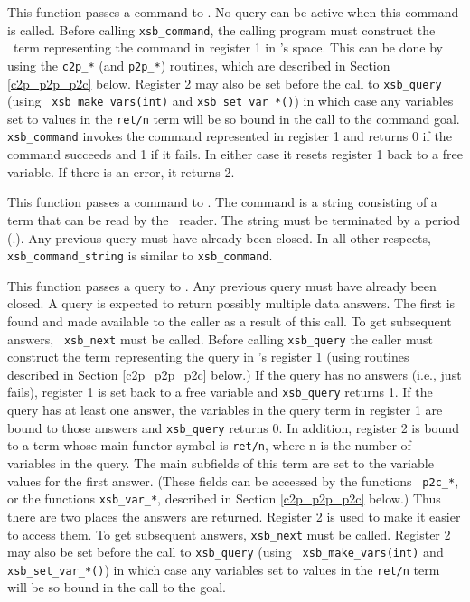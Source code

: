 \begin{description}
 
This function passes a command to \ourprolog .  No query can be active
when this command is called.  Before calling {\tt xsb\_command}, the
calling program must construct the \ourprolog\ term representing the
command in register 1 in \ourprolog 's space.  This can be done by
using the {\tt c2p\_*} (and {\tt p2p\_*}) routines, which are
described in Section \ref{c2p_p2p_p2c} below.  Register 2 may also be
set before the call to {\tt xsb\_query} (using {\tt
xsb\_make\_vars(int)} and {\tt xsb\_set\_var\_*()}) in which case any
variables set to values in the {\tt ret/n} term will be so bound in
the call to the command goal.  {\tt xsb\_command} invokes the command
represented in register 1 and returns 0 if the command succeeds and 1
if it fails. In either case it resets register 1 back to a free
variable. If there is an error, it returns 2.

 
This function passes a command to \ourprolog .  The command is a
string consisting of a term that can be read by the \ourprolog\
reader.  The string must be terminated by a period (.).  Any previous
query must have already been closed.  In all other respects, {\tt
xsb\_command\_string} is similar to {\tt xsb\_command}.

 
This function passes a query to \ourprolog .  Any previous query must
have already been closed.  A query is expected to return possibly
multiple data answers.  The first is found and made available to the
caller as a result of this call.  To get subsequent answers, {\tt
xsb\_next} must be called.  Before calling {\tt xsb\_query} the caller
must construct the term representing the query in \ourprolog 's
register 1 (using routines described in Section \ref{c2p_p2p_p2c}
below.)  If the query has no answers (i.e., just fails), register 1 is
set back to a free variable and {\tt xsb\_query} returns 1.  If the
query has at least one answer, the variables in the query term in
register 1 are bound to those answers and {\tt xsb\_query} returns 0.
In addition, register 2 is bound to a term whose main functor symbol
is {\tt ret/n}, where n is the number of variables in the query. The
main subfields of this term are set to the variable values for the
first answer. (These fields can be accessed by the functions {\tt
p2c\_*}, or the functions {\tt xsb\_var\_*}, described in Section
\ref{c2p_p2p_p2c} below.)  Thus there are two places the answers are
returned. Register 2 is used to make it easier to access them.  To get
subsequent answers, {\tt xsb\_next} must be called.  Register 2 may
also be set before the call to {\tt xsb\_query} (using {\tt
xsb\_make\_vars(int)} and {\tt xsb\_set\_var\_*()}) in which case any
variables set to values in the {\tt ret/n} term will be so bound in
the call to the goal.


\end{description}
